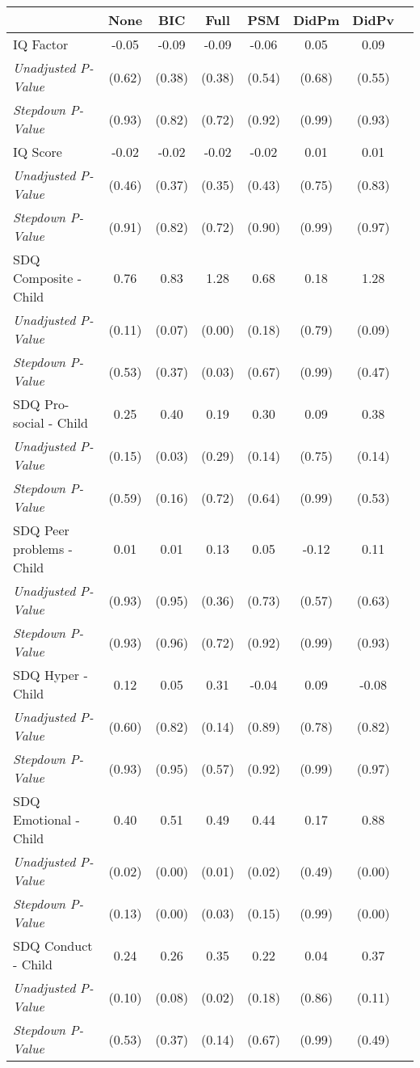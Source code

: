 \begin{tabular}{l c c c c c c c}
\toprule
 & None & BIC & Full & PSM & DidPm & DidPv \\
\midrule
IQ Factor & -0.05 & -0.09 & -0.09 & -0.06 & 0.05 & 0.09 \\
\quad \textit{Unadjusted P-Value} & (0.62) & (0.38) & (0.38) & (0.54) & (0.68) & (0.55) \\
\quad \textit{Stepdown P-Value} & (0.93) & (0.82) & (0.72) & (0.92) & (0.99) & (0.93) \\
IQ Score & -0.02 & -0.02 & -0.02 & -0.02 & 0.01 & 0.01 \\
\quad \textit{Unadjusted P-Value} & (0.46) & (0.37) & (0.35) & (0.43) & (0.75) & (0.83) \\
\quad \textit{Stepdown P-Value} & (0.91) & (0.82) & (0.72) & (0.90) & (0.99) & (0.97) \\
SDQ Composite - Child & 0.76 & 0.83 & 1.28 & 0.68 & 0.18 & 1.28 \\
\quad \textit{Unadjusted P-Value} & (0.11) & (0.07) & (0.00) & (0.18) & (0.79) & (0.09) \\
\quad \textit{Stepdown P-Value} & (0.53) & (0.37) & (0.03) & (0.67) & (0.99) & (0.47) \\
SDQ Pro-social - Child & 0.25 & 0.40 & 0.19 & 0.30 & 0.09 & 0.38 \\
\quad \textit{Unadjusted P-Value} & (0.15) & (0.03) & (0.29) & (0.14) & (0.75) & (0.14) \\
\quad \textit{Stepdown P-Value} & (0.59) & (0.16) & (0.72) & (0.64) & (0.99) & (0.53) \\
SDQ Peer problems - Child & 0.01 & 0.01 & 0.13 & 0.05 & -0.12 & 0.11 \\
\quad \textit{Unadjusted P-Value} & (0.93) & (0.95) & (0.36) & (0.73) & (0.57) & (0.63) \\
\quad \textit{Stepdown P-Value} & (0.93) & (0.96) & (0.72) & (0.92) & (0.99) & (0.93) \\
SDQ Hyper - Child & 0.12 & 0.05 & 0.31 & -0.04 & 0.09 & -0.08 \\
\quad \textit{Unadjusted P-Value} & (0.60) & (0.82) & (0.14) & (0.89) & (0.78) & (0.82) \\
\quad \textit{Stepdown P-Value} & (0.93) & (0.95) & (0.57) & (0.92) & (0.99) & (0.97) \\
SDQ Emotional - Child & 0.40 & 0.51 & 0.49 & 0.44 & 0.17 & 0.88 \\
\quad \textit{Unadjusted P-Value} & (0.02) & (0.00) & (0.01) & (0.02) & (0.49) & (0.00) \\
\quad \textit{Stepdown P-Value} & (0.13) & (0.00) & (0.03) & (0.15) & (0.99) & (0.00) \\
SDQ Conduct - Child & 0.24 & 0.26 & 0.35 & 0.22 & 0.04 & 0.37 \\
\quad \textit{Unadjusted P-Value} & (0.10) & (0.08) & (0.02) & (0.18) & (0.86) & (0.11) \\
\quad \textit{Stepdown P-Value} & (0.53) & (0.37) & (0.14) & (0.67) & (0.99) & (0.49) \\
\bottomrule
\end{tabular}
